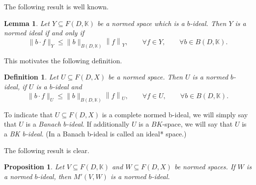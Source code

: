 \documentclass[14pt, a4paper]{article}  %
\providecommand{\pare}[1]{\left( #1\right) }
\providecommand{\norm}[1]{\left\lVert#1\right\rVert}
\newcommand{\K}{\mathbb{K}}
\newtheorem{proposition}{Proposition}[section]
\newtheorem{lemma}{Lemma}[section]
\newtheorem{definition}{Definition}[section]
\begin{document}
	The following result is well known.  
	\begin{lemma}\label{lol2_1}
		Let $Y \subseteq F(D,\K)$ be a normed space which is a  $b$-ideal. Then $Y$ is a normed ideal if and only if
		\begin{equation}\label{lol}
			\|b \cdot f\|_{Y} \leq \|b\|_{B\pare{D,\K}} \norm{f}_{Y},\qquad \forall f\in Y,\qquad \forall b\in B\pare{D,\K}.
		\end{equation}
	\end{lemma}
%	
 
	
	
	
	

	
 This motivates the following definition.
	
	\begin{definition}\label{lola108_new}
		Let $U\subseteq F(D, X)$ be a  normed space. Then $U$ is a normed $b$-ideal, if $U$ is a $b$-ideal and \begin{equation}
			\|b \cdot f\|_{U} \leq \|b\|_{B\pare{D,\K}} \norm{f}_{U},\qquad \forall f\in U,\qquad \forall b\in B\pare{D,\K}.
		\end{equation} 
	\end{definition} 
	
	To indicate that $U \subseteq F(D,X)$ is a complete normed b-ideal, we will simply say that $U$ is a \emph{Banach $b$-ideal}. If additionally  $U$ is a $BK$-space, we will say that $U$ is a \emph{BK b-ideal}.  (In \cite[p. 814]{V}   a Banach b-ideal is called an ideal* space.)
	
	
The  following result is clear. 

\begin{proposition}\label{sam1}  
	Let $V \subseteq F\pare{D, \K}$ and $W \subseteq F\pare{D, X}$ be normed spaces. If $W$ is a normed $b$-ideal, then $M'\pare{V,W}$ is a normed $b$-ideal.
\end{proposition}
\end{document}
